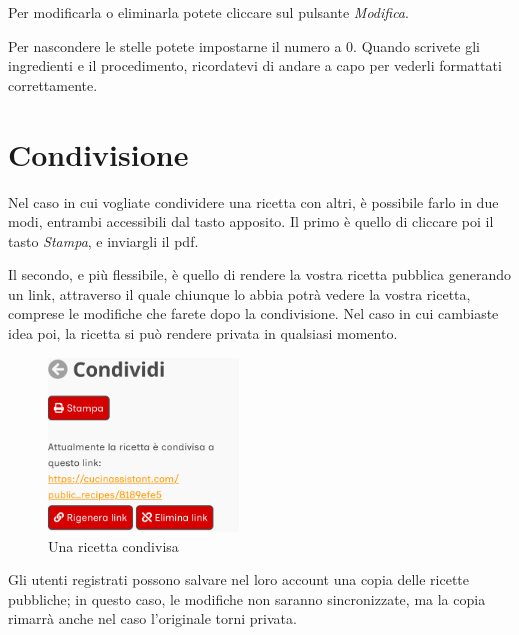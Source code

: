 \documentclass[12pt, a4paper]{report}
\begin{document}
    Per modificarla o eliminarla potete cliccare sul pulsante \emph{Modifica}.

    Per nascondere le stelle potete impostarne il numero a 0. Quando scrivete gli ingredienti e il procedimento, ricordatevi di andare a capo per
    vederli formattati correttamente.

	\section{Condivisione} \label{recipesharing}

	Nel caso in cui vogliate condividere una ricetta con altri, è possibile farlo in due modi, entrambi accessibili dal tasto apposito.
	Il primo è quello di cliccare poi il tasto \emph{Stampa}, e inviargli il pdf.

	Il secondo, e più flessibile, è quello di rendere la vostra ricetta pubblica generando un link, attraverso il quale chiunque lo abbia potrà
	vedere la vostra ricetta, comprese le modifiche che farete dopo la condivisione. Nel caso in cui cambiaste idea poi, la ricetta si può rendere
	privata in qualsiasi momento.

    \begin{figure}[H]
        \centering
        \includegraphics[width=0.45\textwidth]{assets/it/recipe_sharing.png}
        \caption{Una ricetta condivisa}
    \end{figure}

	Gli utenti registrati possono salvare nel loro account una copia delle ricette pubbliche; in questo caso, le modifiche non saranno sincronizzate,
	ma la copia rimarrà anche nel caso l'originale torni privata.	
\end{document}
